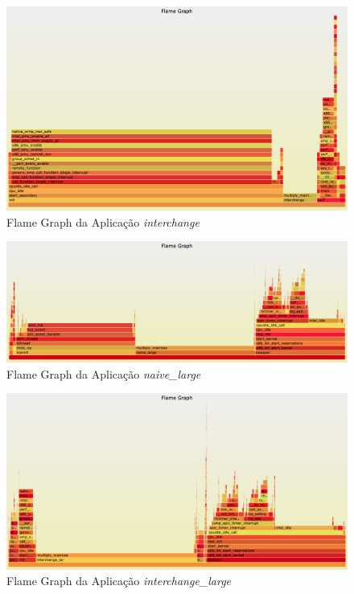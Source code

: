 \documentclass[conference,compsoc]{IEEEtran}
\begin{document}
\begin{figure}[h!]
\centering
\includegraphics[scale=0.2]{flame_graph_interchange.png}
\caption{Flame Graph da Aplicação \textit{interchange}}
\end{figure}

\begin{figure}[h!]
\centering
\includegraphics[scale=0.2]{flame_graph_naive_large.png}
\caption{Flame Graph da Aplicação \textit{naive\_large}}
\end{figure}

\begin{figure}[h!]
\centering
\includegraphics[scale=0.2]{flame_graph_interchange_large.png}
\caption{Flame Graph da Aplicação \textit{interchange\_large}}
\end{figure}
\end{document}
